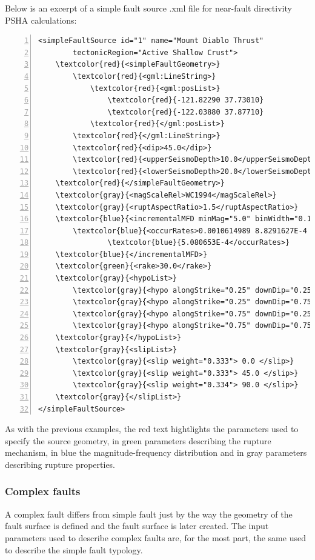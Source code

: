 Below is an excerpt of a simple fault source .xml file for near-fault directivity PSHA calculations:
\begin{Verbatim}[frame=single, commandchars=\\\{\}, fontsize=\footnotesize,
    numbers=left, numbersep=2pt]
<simpleFaultSource id="1" name="Mount Diablo Thrust"
        tectonicRegion="Active Shallow Crust">
    \textcolor{red}{<simpleFaultGeometry>}
        \textcolor{red}{<gml:LineString>}
            \textcolor{red}{<gml:posList>}
                \textcolor{red}{-121.82290 37.73010}
                \textcolor{red}{-122.03880 37.87710}
            \textcolor{red}{</gml:posList>}
        \textcolor{red}{</gml:LineString>}
        \textcolor{red}{<dip>45.0</dip>}
        \textcolor{red}{<upperSeismoDepth>10.0</upperSeismoDepth>}
        \textcolor{red}{<lowerSeismoDepth>20.0</lowerSeismoDepth>}
    \textcolor{red}{</simpleFaultGeometry>}
    \textcolor{gray}{<magScaleRel>WC1994</magScaleRel>}
    \textcolor{gray}{<ruptAspectRatio>1.5</ruptAspectRatio>}
    \textcolor{blue}{<incrementalMFD minMag="5.0" binWidth="0.1">}
        \textcolor{blue}{<occurRates>0.0010614989 8.8291627E-4 7.3437777E-4 6.108288E-4 }
                \textcolor{blue}{5.080653E-4</occurRates>}
    \textcolor{blue}{</incrementalMFD>}
    \textcolor{green}{<rake>30.0</rake>}
    \textcolor{gray}{<hypoList>}
        \textcolor{gray}{<hypo alongStrike="0.25" downDip="0.25" weight="0.25"/>}
        \textcolor{gray}{<hypo alongStrike="0.25" downDip="0.75" weight="0.25"/>}
        \textcolor{gray}{<hypo alongStrike="0.75" downDip="0.25" weight="0.25"/>}
        \textcolor{gray}{<hypo alongStrike="0.75" downDip="0.75" weight="0.25"/>}
    \textcolor{gray}{</hypoList>}
    \textcolor{gray}{<slipList>}
        \textcolor{gray}{<slip weight="0.333"> 0.0 </slip>}
        \textcolor{gray}{<slip weight="0.333"> 45.0 </slip>}
        \textcolor{gray}{<slip weight="0.334"> 90.0 </slip>}
    \textcolor{gray}{</slipList>}
</simpleFaultSource>
\end{Verbatim}
As with the previous examples, the red text hightlights 
the parameters used to specify the source geometry, in green parameters 
describing the rupture mechanism, in blue the magnitude-frequency 
distribution and in gray parameters describing rupture properties.
%
\subsubsection{Complex faults}
%
A complex fault differs from simple fault just by the way the geometry of 
the fault surface is defined and the fault surface is later created. 
The input parameters used to describe complex faults are, for the most 
part, the same used to describe the simple fault typology.

